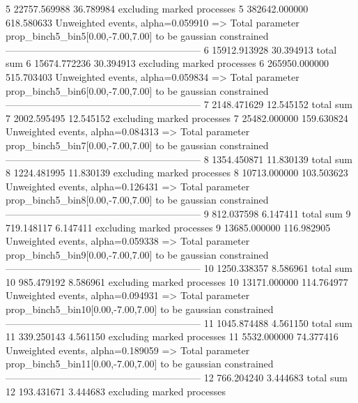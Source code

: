 5          22757.569988    36.789984       excluding marked processes    
5          382642.000000   618.580633      Unweighted events, alpha=0.059910
  => Total parameter prop_binch5_bin5[0.00,-7.00,7.00] to be gaussian constrained
------------------------------------------------------------
6          15912.913928    30.394913       total sum                     
6          15674.772236    30.394913       excluding marked processes    
6          265950.000000   515.703403      Unweighted events, alpha=0.059834
  => Total parameter prop_binch5_bin6[0.00,-7.00,7.00] to be gaussian constrained
------------------------------------------------------------
7          2148.471629     12.545152       total sum                     
7          2002.595495     12.545152       excluding marked processes    
7          25482.000000    159.630824      Unweighted events, alpha=0.084313
  => Total parameter prop_binch5_bin7[0.00,-7.00,7.00] to be gaussian constrained
------------------------------------------------------------
8          1354.450871     11.830139       total sum                     
8          1224.481995     11.830139       excluding marked processes    
8          10713.000000    103.503623      Unweighted events, alpha=0.126431
  => Total parameter prop_binch5_bin8[0.00,-7.00,7.00] to be gaussian constrained
------------------------------------------------------------
9          812.037598      6.147411        total sum                     
9          719.148117      6.147411        excluding marked processes    
9          13685.000000    116.982905      Unweighted events, alpha=0.059338
  => Total parameter prop_binch5_bin9[0.00,-7.00,7.00] to be gaussian constrained
------------------------------------------------------------
10         1250.338357     8.586961        total sum                     
10         985.479192      8.586961        excluding marked processes    
10         13171.000000    114.764977      Unweighted events, alpha=0.094931
  => Total parameter prop_binch5_bin10[0.00,-7.00,7.00] to be gaussian constrained
------------------------------------------------------------
11         1045.874488     4.561150        total sum                     
11         339.250143      4.561150        excluding marked processes    
11         5532.000000     74.377416       Unweighted events, alpha=0.189059
  => Total parameter prop_binch5_bin11[0.00,-7.00,7.00] to be gaussian constrained
------------------------------------------------------------
12         766.204240      3.444683        total sum                     
12         193.431671      3.444683        excluding marked processes    

